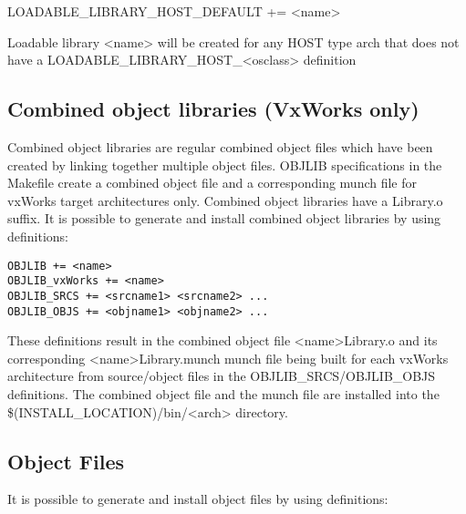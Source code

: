 \begin{description}\item LOADABLE\_LIBRARY\_HOST\_DEFAULT += \textless{}name\textgreater{}

\end{description}Loadable library \textless{}name\textgreater{} will be created for any HOST type arch that does not have a 
LOADABLE\_LIBRARY\_HOST\_\textless{}osclass\textgreater{} definition

\subsection{ Combined object libraries (VxWorks only)}

Combined object libraries are regular combined object files which have been created by linking together multiple object 
files. OBJLIB specifications in the Makefile create a combined object file and a corresponding munch file for vxWorks 
target architectures only. Combined object libraries have a Library.o suffix. It is possible to generate and install combined 
object libraries by using definitions:

\begin{verbatim}OBJLIB += <name>
OBJLIB_vxWorks += <name>
OBJLIB_SRCS += <srcname1> <srcname2> ...
OBJLIB_OBJS += <objname1> <objname2> ...
\end{verbatim}
These definitions result in the combined object file \textless{}name\textgreater{}Library.o and its corresponding \textless{}name\textgreater{}Library.munch munch 
file being built for each vxWorks architecture from source/object files in the OBJLIB\_SRCS/OBJLIB\_OBJS definitions. 
The combined object file and the munch file are installed into the \$(INSTALL\_LOCATION)/bin/\textless{}arch\textgreater{} directory. 

\subsection{Object Files}

It is possible to generate and install object files by using definitions:

